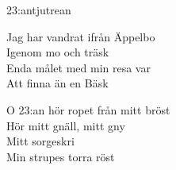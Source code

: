 \begin{song}{23:an}{tjutrean}
\begin{vers}
Jag har vandrat ifrån Äppelbo\\
Igenom mo och träsk\\
Enda målet med min resa var\\
Att finna än en Bäsk\\
\end{vers}
\begin{vers}
O 23:an hör ropet från mitt bröst\\
Hör mitt gnäll, mitt gny\\
Mitt sorgeskri\\
Min strupes torra röst\\
\end{vers}
\end{song}
